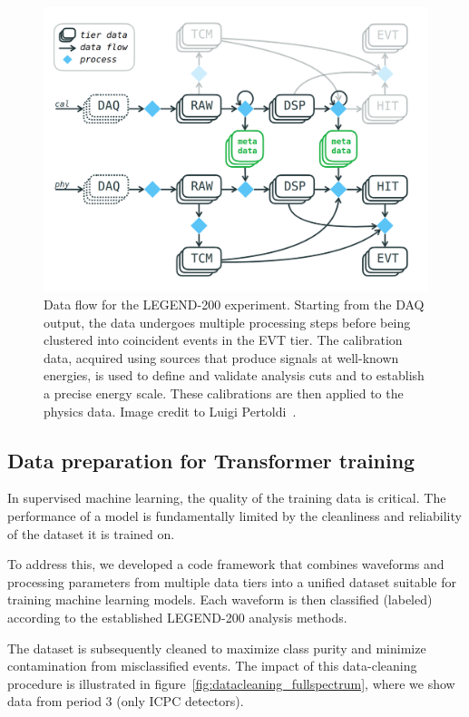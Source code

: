 \begin{figure}[t]
    \centering
    \includegraphics[width=0.85\linewidth]{figures/05_PSD/Data_flow.png}
    \caption{Data flow for the LEGEND-200 experiment. Starting from the DAQ output, the data undergoes multiple processing steps before being clustered into coincident events in the EVT tier. The calibration data, acquired using sources that produce signals at well-known energies, is used to define and validate analysis cuts and to establish a precise energy scale. These calibrations are then applied to the physics data. Image credit to Luigi Pertoldi~\cite{noauthor_pyhep_2023}. } 
\label{fig:data_flow}
\end{figure}


\subsection{Data preparation for Transformer training}

In supervised machine learning, the quality of the training data is critical. The performance of a model is fundamentally limited by the cleanliness and reliability of the dataset it is trained on. 

To address this, we developed a code framework that combines waveforms and processing parameters from multiple data tiers into a unified dataset suitable for training machine learning models. Each waveform is then classified (labeled) according to the established LEGEND-200 analysis methods. 

The dataset is subsequently cleaned to maximize class purity and minimize contamination from misclassified events. The impact of this data-cleaning procedure is illustrated in figure~\ref{fig:datacleaning_fullspectrum}, where we show data from period 3 (only ICPC detectors).

